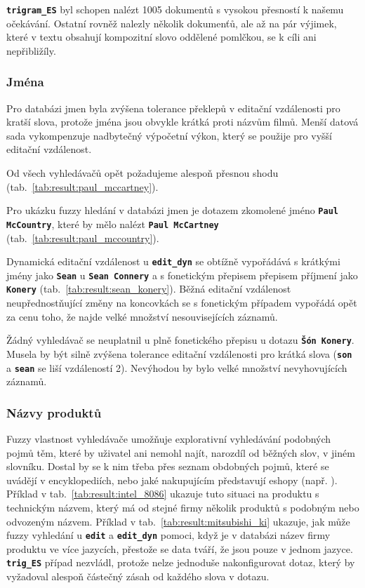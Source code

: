 \documentclass[11pt,letterpaper,oneside,openright]{book}
\newcommand{\bftt}[1]{\texttt{\textbf{#1}}}
\begin{document}
\bftt{trigram\_ES} byl schopen nalézt 1005 dokumentů s vysokou přesností k
našemu očekávání. Ostatní rovněž nalezly několik dokumenťů, ale až na pár
výjimek, které v textu obsahují kompozitní slovo oddělené pomlčkou, se k cíli
ani nepřibližíly.

\subsubsection{Jména}
Pro databázi jmen byla zvýšena tolerance překlepů v editační vzdálenosti pro
kratší slova, protože jména jsou obvykle krátká proti názvům filmů. Menší
datová sada vykompenzuje nadbytečný výpočetní výkon, který se použije pro vyšší
editační vzdálenost.

\mbox{}\mbox{}

Od všech vyhledávačů opět požadujeme alespoň přesnou shodu
(tab.~\ref{tab:result:paul_mccartney}).

\mbox{}\mbox{}

Pro ukázku fuzzy hledání v databázi jmen je dotazem zkomolené jméno
\bftt{Paul McCountry}, které by mělo nalézt \bftt{Paul McCartney}
(tab.~\ref{tab:result:paul_mccountry}).

\mbox{}\mbox{}

Dynamická editační vzdálenost u \bftt{edit\_dyn} se obtížně vypořádává s
krátkými jmény jako \bftt{Sean} u \bftt{Sean Connery} a s fonetickým přepisem
přepisem příjmení jako \bftt{Konery} (tab.~\ref{tab:result:sean_konery}). Běžná
editační vzdálenost neupřednostňující změny na koncovkách se s fonetickým
případem vypořádá opět za cenu toho, že najde velké množství nesouvisejících
záznamů.

Žádný vyhledávač se neuplatnil u plně fonetického přepisu u dotazu \bftt{Šón
Konery}. Musela by být silně zvýšena tolerance editační vzdálenosti pro krátká
slova (\bftt{son} a \bftt{sean} se liší vzdáleností 2). Nevýhodou by bylo velké
množství nevyhovujících záznamů.

\subsubsection{Názvy produktů}

\mbox{}\mbox{}

Fuzzy vlastnost vyhledávače umožňuje explorativní vyhledávání podobných pojmů
těm, které by uživatel ani nemohl najít, narozdíl od běžných slov, v jiném
slovníku. Dostal by se k nim třeba přes seznam obdobných pojmů, které se
uvádějí v encyklopediích, nebo jaké nakupujícím představují eshopy (např.
). Příklad v tab.~\ref{tab:result:intel_8086}
ukazuje tuto situaci na produktu s technickým názvem, který má od stejné firmy
několik produktů s podobným nebo odvozeným názvem. Příklad v
tab.~\ref{tab:result:mitsubishi_ki} ukazuje, jak může fuzzy vyhledání u
\bftt{edit} a \bftt{edit\_dyn} pomoci, když je v databázi název firmy produktu
ve více jazycích, přestože se data tváří, že jsou pouze v jednom jazyce.
\bftt{trig\_ES} případ nezvládl, protože nelze jednoduše nakonfigurovat dotaz,
který by vyžadoval alespoň částečný zásah od každého slova v dotazu.
\end{document}
